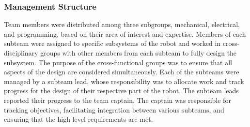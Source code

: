 \documentclass[class=article, crop=false]{standalone}
\begin{document}
	\subsubsection{Management Structure}
	Team members were distributed among three subgroups, mechanical, electrical, and programming, based on their area of interest and expertise. Members of each subteam were assigned to specific subsystems of the robot and worked in cross-disciplinary groups with other members from each subteam to fully design the subsystem. The purpose of the cross-functional groups was to ensure that all aspects of the design are considered simultaneously. Each of the subteams were managed by a subteam lead, whose responsibility was to allocate work and track progress for the design of their respective part of the robot. The subteam leads reported their progress to the team captain. The captain was responsible for tracking objectives, facilitating integration between various subteams, and ensuring that the high-level requirements are met.
\end{document}
